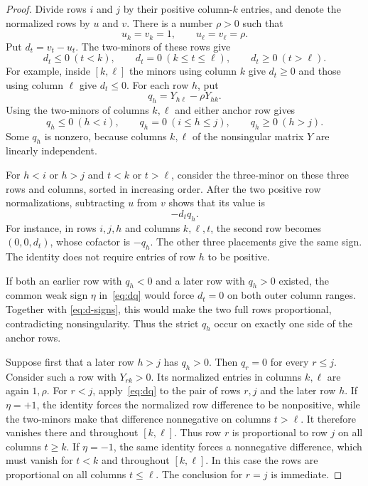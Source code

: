 \documentclass[11pt]{article}
\theoremstyle{definition}
\theoremstyle{remark}
\numberwithin{equation}{section}
\begin{document}
\begin{proof}
Divide rows $i$ and $j$ by their positive column-$k$ entries, and
denote the normalized rows by $u$ and $v$. There is a number $\rho>0$
such that
\[
 u_k=v_k=1,\qquad u_\ell=v_\ell=\rho.
\]
Put $d_t=v_t-u_t$. The two-minors of these rows give
\begin{equation}\label{eq:d-signs}
 d_t\leq0\ (t<k),\qquad
 d_t=0\ (k\leq t\leq\ell),\qquad
 d_t\geq0\ (t>\ell).
\end{equation}
For example, inside $[k,\ell]$ the minors using column $k$ give
$d_t\geq0$ and those using column $\ell$ give $d_t\leq0$.
For each row $h$, put
\[
 q_h=Y_{h\ell}-\rho Y_{hk}.
\]
Using the two-minors of columns $k,\ell$ and either anchor row gives
\begin{equation}\label{eq:q-signs}
 q_h\leq0\ (h<i),\qquad
 q_h=0\ (i\leq h\leq j),\qquad
 q_h\geq0\ (h>j).
\end{equation}
Some $q_h$ is nonzero, because columns $k,\ell$ of the nonsingular
matrix $Y$ are linearly independent.

For $h<i$ or $h>j$ and $t<k$ or $t>\ell$, consider the three-minor
on these three rows and columns, sorted in increasing order. After
the two positive row normalizations, subtracting $u$ from $v$ shows
that its value is
\begin{equation}\label{eq:dq}
 -d_tq_h.
\end{equation}
For instance, in rows $i,j,h$ and columns $k,\ell,t$, the second row
becomes $(0,0,d_t)$, whose cofactor is $-q_h$.
The other three placements give the same sign. The identity does not
require entries of row $h$ to be positive.

If both an earlier row with $q_h<0$ and a later row with $q_h>0$
existed, the common weak sign $\eta$ in~\eqref{eq:dq} would force
$d_t=0$ on both outer column ranges. Together with
\eqref{eq:d-signs}, this would make the two full rows proportional,
contradicting nonsingularity. Thus the strict $q_h$ occur on exactly
one side of the anchor rows.

Suppose first that a later row $h>j$ has $q_h>0$. Then $q_r=0$
for every $r\leq j$. Consider such a row with $Y_{rk}>0$.
Its normalized entries in columns $k,\ell$ are again $1,\rho$.
For $r<j$, apply~\eqref{eq:dq} to the pair of rows $r,j$ and
the later row $h$. If $\eta=+1$, the identity forces the normalized
row difference to be nonpositive, while the two-minors make that
difference nonnegative on columns $t>\ell$. It therefore vanishes
there and throughout $[k,\ell]$. Thus row $r$ is proportional to
row $j$ on all columns $t\geq k$. If $\eta=-1$, the same identity
forces a nonnegative difference, which must vanish for $t<k$ and
throughout $[k,\ell]$. In this case the rows are proportional on
all columns $t\leq\ell$. The conclusion for $r=j$ is immediate.


\end{proof}
\end{document}

